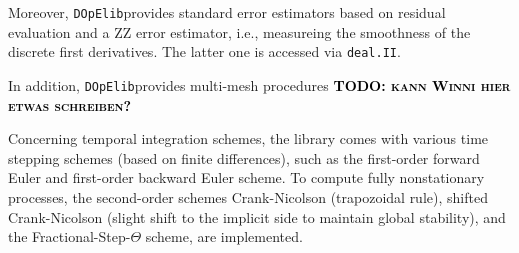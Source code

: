\documentclass[prodmode,acmtoms]{acmsmall}
\numberwithin{equation}{section}
\newcommand{\deal}{\texttt{deal.II}}
\newcommand{\dope}{\texttt{DOpElib}}
\newcommand{\todo}[1]{\textbf{\textsc{\textcolor{black}{TODO: #1}}}}
\begin{document}
Moreover, \dope provides standard error estimators based on residual evaluation and 
a ZZ error estimator, i.e., measureing the smoothness of the discrete first derivatives.
The latter one is accessed via \deal. 

In addition, \dope provides multi-mesh procedures 
\todo{kann Winni hier etwas schreiben?}

Concerning temporal integration schemes, the library comes 
with various time stepping schemes (based on finite differences), 
such as the first-order forward Euler and first-order backward Euler scheme. 
To compute fully nonstationary processes, the second-order schemes
Crank-Nicolson (trapozoidal rule), 
shifted Crank-Nicolson (slight shift to the implicit side to maintain
global stability), 
and the Fractional-Step-$\Theta$ scheme, are implemented.
\end{document}
